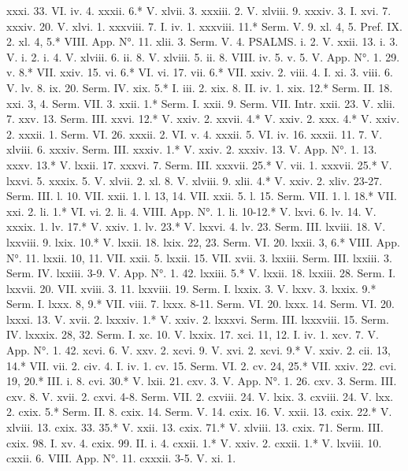 xxxi. 33.	VI. iv. 4.
xxxii. 6.*	V. xlvii. 3.
xxxiii. 2.	V. xlviii. 9.
xxxiv. 3.	I. xvi. 7.
xxxiv. 20.	V. xlvi. 1.
xxxviii. 7.	I. iv. 1.
xxxviii. 11.*	Serm. V. 9.
xl. 4, 5.	Pref. IX. 2.
xl. 4, 5.*	VIII. App. N°. 11.
xlii. 3.	Serm. V. 4.
PSALMS.
i. 2.	V. xxii. 13.
i. 3.	V. i. 2.
i. 4.	V. xlviii. 6.
ii. 8.	V. xlviii. 5.
ii. 8.	VIII. iv. 5.
v. 5.	V. App. N°. 1. 29.
v. 8.*	VII. xxiv. 15.
vi. 6.*	VI. vi. 17.
vii. 6.*	VII. xxiv. 2.
viii. 4.	I. xi. 3.
viii. 6.	V. lv. 8.
ix. 20.	Serm. IV.
xix. 5.*	I. iii. 2.
xix. 8.	II. iv. 1.
xix. 12.*	Serm. II. 18.
xxi. 3, 4.	Serm. VII. 3.
xxii. 1.*	Serm. I.
xxii. 9.	Serm. VII. Intr.
xxii. 23.	V. xlii. 7.
xxv. 13.	Serm. III.
xxvi. 12.*	V. xxiv. 2.
xxvii. 4.*	V. xxiv. 2.
xxx. 4.*	V. xxiv. 2.
xxxii. 1.	Serm. VI. 26.
xxxii. 2.	VI. v. 4.
xxxii. 5.	VI. iv. 16.
xxxii. 11. 7.	V. xlviii. 6.
xxxiv.	Serm. III.
xxxiv. 1.*	V. xxiv. 2.
xxxiv. 13.	V. App. N°. 1. 13.
xxxv. 13.*	V. lxxii. 17.
xxxvi. 7.	Serm. III.
xxxvii. 25.*	V. vii. 1.
xxxvii. 25.*	V. lxxvi. 5.
xxxix. 5.	V. xlvii. 2.
xl. 8.	V. xlviii. 9.
xlii. 4.*	V. xxiv. 2.
xliv. 23-27.	Serm. III.
l. 10.	VII. xxii. 1.
l. 13, 14.	VII. xxii. 5.
l. 15.	Serm. VII. 1.
l. 18.*	VII. xxi. 2.
li. 1.*	VI. vi. 2.
li. 4.	VIII. App. N°. 1.
li. 10-12.*	V. lxvi. 6.
lv. 14.	V. xxxix. 1.
lv. 17.*	V. xxiv. 1.
lv. 23.*	V. lxxvi. 4.
lv. 23.	Serm. III.
lxviii. 18.	V. lxxviii. 9.
lxix. 10.*	V. lxxii. 18.
lxix. 22, 23.	Serm. VI. 20.
lxxii. 3, 6.*	VIII. App. N°. 11.
lxxii. 10, 11.	VII. xxii. 5.
lxxii. 15.	VII. xvii. 3.
lxxiii.	Serm. III.
lxxiii. 3.	Serm. IV.
lxxiii. 3-9.	V. App. N°. 1. 42.
lxxiii. 5.*	V. lxxii. 18.
lxxiii. 28.	Serm. I.
lxxvii. 20.	VII. xviii. 3. 11.
lxxviii. 19.	Serm. I.
lxxix. 3.	V. lxxv. 3.
lxxix. 9.*	Serm. I.
lxxx. 8, 9.*	VII. viii. 7.
lxxx. 8-11.	Serm. VI. 20.
lxxx. 14.	Serm. VI. 20.
lxxxi. 13.	V. xvii. 2.
lxxxiv. 1.*	V. xxiv. 2.
lxxxvi.	Serm. III.
lxxxviii. 15.	Serm. IV.
lxxxix. 28, 32.	Serm. I.
xc. 10.	V. lxxix. 17.
xci. 11, 12.	I. iv. 1.
xcv. 7.	V. App. N°. 1. 42.
xcvi. 6.	V. xxv. 2.
xcvi. 9.	V. xvi. 2.
xcvi. 9.*	V. xxiv. 2.
cii. 13, 14.*	VII. vii. 2.
civ. 4.	I. iv. 1.
cv. 15.	Serm. VI. 2.
cv. 24, 25.*	VII. xxiv. 22.
cvi. 19, 20.*	III. i. 8.
cvi. 30.*	V. lxii. 21.
cxv. 3.	V. App. N°. 1. 26.
cxv. 3.	Serm. III.
cxv. 8.	V. xvii. 2.
cxvi. 4-8.	Serm. VII. 2.
cxviii. 24.	V. lxix. 3.
cxviii. 24.	V. lxx. 2.
cxix. 5.*	Serm. II. 8.
cxix. 14.	Serm. V. 14.
cxix. 16.	V. xxii. 13.
cxix. 22.*	V. xlviii. 13.
cxix. 33. 35.*	V. xxii. 13.
cxix. 71.*	V. xlviii. 13.
cxix. 71.	Serm. III.
cxix. 98.	I. xv. 4.
cxix. 99.	II. i. 4.
cxxii. 1.*	V. xxiv. 2.
cxxii. 1.*	V. lxviii. 10.
cxxii. 6.	VIII. App. N°. 11.
cxxxii. 3-5.	V. xi. 1.
